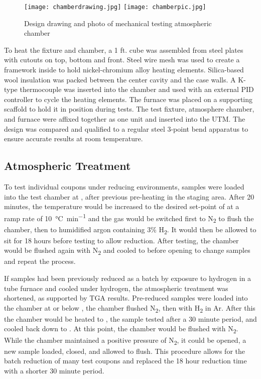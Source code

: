         \begin{figure}[p]
            \texttt{[image: chamberdrawing.jpg]}
            \texttt{[image: chamberpic.jpg]}
            \caption{Design drawing and photo of mechanical testing atmospheric chamber}
            \label{fig:chamber}
        \end{figure}

        To heat the fixture and chamber, a 1 ft. cube was assembled from steel plates with cutouts on top, bottom and front.
        Steel wire mesh was used to create a framework inside to hold nickel-chromium alloy heating elements.
        Silica-based wool insulation was packed between the center cavity and the case walls.
        A K-type thermocouple was inserted into the chamber and used with an external PID controller to cycle the heating elements.
        The furnace was placed on a supporting scaffold to hold it in position during tests.
        The test fixture, atmosphere chamber, and furnace were affixed together as one unit and inserted into the UTM.
        The design was compared and qualified to a regular steel 3-point bend apparatus to ensure accurate results at room temperature.

    \subsection{Atmospheric Treatment}
        To test individual coupons under reducing environments, samples were loaded into the test chamber at , after previous pre-heating in the staging area.
        After 20 minutes, the temperature would be increased to the desired set-point of  at a ramp rate of \SI{10}{\celsius\per\minute} and the gas would be switched first to N\textsubscript{2} to flush the chamber, then to humidified argon containing 3\% H\textsubscript{2}.
        It would then be allowed to sit for 18 hours before testing to allow reduction.
        After testing, the chamber would be flushed again with N\textsubscript{2} and cooled to  before opening to change samples and repeat the process.

        If samples had been previously reduced as a batch by exposure to hydrogen in a tube furnace and cooled under hydrogen, the atmospheric treatment was shortened, as supported by TGA results.
        Pre-reduced samples were loaded into the chamber at or below , the chamber flushed N\textsubscript{2}, then with H\textsubscript{2} in Ar.
        After this the chamber would be heated to , the sample tested after a 30
        minute period, and cooled back down to .
        At this point, the chamber would be flushed with N\textsubscript{2}.
        While the chamber maintained a positive pressure of N\textsubscript{2}, it could be opened, a new sample loaded, closed, and allowed to flush.
        This procedure allows for the batch reduction of many test coupons and replaced the 18 hour reduction time with a shorter 30 minute period.

